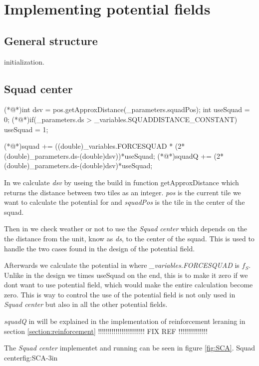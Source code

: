 \section{Implementing potential fields}
	
	\subsection{General structure}
	initialization.
	 
	
	\subsection{Squad center}	
		\begin{Sourcecode}[caption=Squad center]
(*@\lnote@*)int dsv = pos.getApproxDistance(_parameters.squadPos);	
int useSquad = 0;
(*@\lnote@*)if(_parameters.ds > _variables.SQUADDISTANCE_CONSTANT)
	useSquad = 1;

(*@\lnote@*)squad += ((double)_variables.FORCESQUAD * (2*(double)_parameters.ds-(double)dsv))*useSquad;
(*@\lnote@*)squadQ += (2*(double)_parameters.ds-(double)dsv)*useSquad;
\end{Sourcecode}
		In  we calculate \textit{dsv} by useing the build in function getApproxDistance which returns the distance between two tiles as an integer. \textit{pos} is the current tile we want to calculate the potential for and \textit{squadPos} is the tile in the center of the squad.
		
		Then in  we check weather or not to use the \textit{Squad center} which depends on the the distance from the unit, know as \textit{ds}, to the center of the squad. This is used to handle the two cases found in the design of the potential field.
		
		Afterwards we calculate the potential in  where \textit{_variables.FORCESQUAD} is $f_{S}$. Unlike in the design we times useSquad on the end, this is to make it zero if we dont want to use potential field, which would make the entire calculation become zero. This is way to control the use of the potential field is not only used in \textit{Squad center} but also in all the other potential fields.
		
		\textit{squadQ} in  will be explained in the implementation of reinforcement leraning in section \ref{section:reinforcement} !!!!!!!!!!!!!!!!!!!!!!!! FIX REF !!!!!!!!!!!!!!!
		
		The \textit{Squad center} implementet and running can be seen in figure \ref{fig:SCA}.
			{Squad center}{fig:SCA}{-3in}
			
